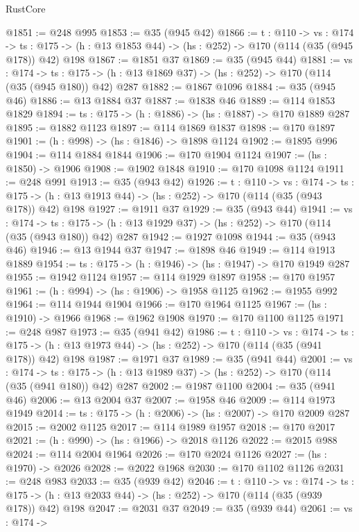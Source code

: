 \begin{lexlean}{RustCore}
\begin{coremodule}
@1851 := @248 @995
@1853 := @35 (@945 @42)
@1866 := {t : @110} ->
  {vs : @174} ->
  {ts : @175} -> (h : @13 @1853 @44) -> (hs : @252) -> @170 (@114 (@35 (@945 @178)) @42) @198
@1867 := @1851 @37
@1869 := @35 (@945 @44)
@1881 := {vs : @174} ->
  {ts : @175} -> (h : @13 @1869 @37) -> (hs : @252) -> @170 (@114 (@35 (@945 @180)) @42) @287
@1882 := @1867 @1096
@1884 := @35 (@945 @46)
@1886 := @13 @1884 @37
@1887 := @1838 @46
@1889 := @114 @1853 @1829
@1894 := {ts : @175} -> (h : @1886) -> (hs : @1887) -> @170 @1889 @287
@1895 := @1882 @1123
@1897 := @114 @1869 @1837
@1898 := @170 @1897
@1901 := (h : @998) -> (hs : @1846) -> @1898 @1124
@1902 := @1895 @996
@1904 := @114 @1884 @1844
@1906 := @170 @1904 @1124
@1907 := (hs : @1850) -> @1906
@1908 := @1902 @1848
@1910 := @170 @1098 @1124
@1911 := @248 @991
@1913 := @35 (@943 @42)
@1926 := {t : @110} ->
  {vs : @174} ->
  {ts : @175} -> (h : @13 @1913 @44) -> (hs : @252) -> @170 (@114 (@35 (@943 @178)) @42) @198
@1927 := @1911 @37
@1929 := @35 (@943 @44)
@1941 := {vs : @174} ->
  {ts : @175} -> (h : @13 @1929 @37) -> (hs : @252) -> @170 (@114 (@35 (@943 @180)) @42) @287
@1942 := @1927 @1098
@1944 := @35 (@943 @46)
@1946 := @13 @1944 @37
@1947 := @1898 @46
@1949 := @114 @1913 @1889
@1954 := {ts : @175} -> (h : @1946) -> (hs : @1947) -> @170 @1949 @287
@1955 := @1942 @1124
@1957 := @114 @1929 @1897
@1958 := @170 @1957
@1961 := (h : @994) -> (hs : @1906) -> @1958 @1125
@1962 := @1955 @992
@1964 := @114 @1944 @1904
@1966 := @170 @1964 @1125
@1967 := (hs : @1910) -> @1966
@1968 := @1962 @1908
@1970 := @170 @1100 @1125
@1971 := @248 @987
@1973 := @35 (@941 @42)
@1986 := {t : @110} ->
  {vs : @174} ->
  {ts : @175} -> (h : @13 @1973 @44) -> (hs : @252) -> @170 (@114 (@35 (@941 @178)) @42) @198
@1987 := @1971 @37
@1989 := @35 (@941 @44)
@2001 := {vs : @174} ->
  {ts : @175} -> (h : @13 @1989 @37) -> (hs : @252) -> @170 (@114 (@35 (@941 @180)) @42) @287
@2002 := @1987 @1100
@2004 := @35 (@941 @46)
@2006 := @13 @2004 @37
@2007 := @1958 @46
@2009 := @114 @1973 @1949
@2014 := {ts : @175} -> (h : @2006) -> (hs : @2007) -> @170 @2009 @287
@2015 := @2002 @1125
@2017 := @114 @1989 @1957
@2018 := @170 @2017
@2021 := (h : @990) -> (hs : @1966) -> @2018 @1126
@2022 := @2015 @988
@2024 := @114 @2004 @1964
@2026 := @170 @2024 @1126
@2027 := (hs : @1970) -> @2026
@2028 := @2022 @1968
@2030 := @170 @1102 @1126
@2031 := @248 @983
@2033 := @35 (@939 @42)
@2046 := {t : @110} ->
  {vs : @174} ->
  {ts : @175} -> (h : @13 @2033 @44) -> (hs : @252) -> @170 (@114 (@35 (@939 @178)) @42) @198
@2047 := @2031 @37
@2049 := @35 (@939 @44)
@2061 := {vs : @174} ->

\end{coremodule}
\end{lexlean}
